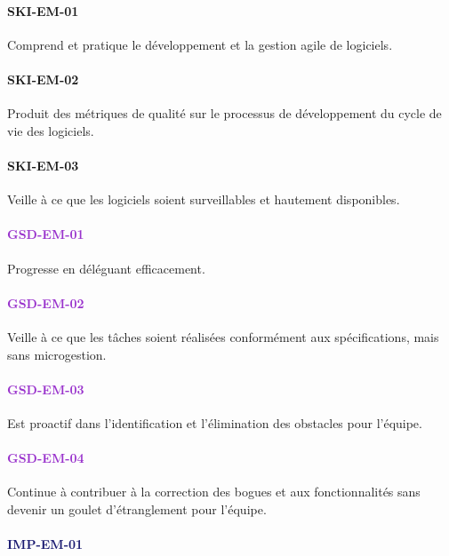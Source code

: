 \documentclass[a4paper, french, openany, 12pt]{book}
\newcommand\dex[1]{\textcolor{BrickRed}{\textbf{\uppercase{ski-{#1}}}}}
\newcommand\str[1]{\textcolor{DarkOrchid}{\textbf{\uppercase{gsd-{#1}}}}}
\newcommand\wis[1]{\textcolor{MidnightBlue}{\textbf{\uppercase{imp-{#1}}}}}
\begin{document}
\begin{multicols}{2}

  \paragraph*{\dex{em-01}}

  Comprend et pratique le développement et la gestion agile de logiciels.

  \paragraph*{\dex{em-02}}

  Produit des métriques de qualité sur le processus de développement du cycle de vie des logiciels.
  
  \paragraph*{\dex{em-03}}

  Veille à ce que les logiciels soient surveillables et hautement disponibles.

  \paragraph*{\str{em-01}}

  Progresse en déléguant efficacement.
  
  \paragraph*{\str{em-02}}

  Veille à ce que les tâches soient réalisées conformément aux spécifications, mais sans microgestion.

  \paragraph*{\str{em-03}}

  Est proactif dans l'identification et l'élimination des obstacles pour l'équipe.

  \paragraph*{\str{em-04}}

  Continue à contribuer à la correction des bogues et aux fonctionnalités sans devenir un goulet d'étranglement pour 
  l'équipe.

  \paragraph*{\wis{em-01}}


\end{multicols}
\end{document}
